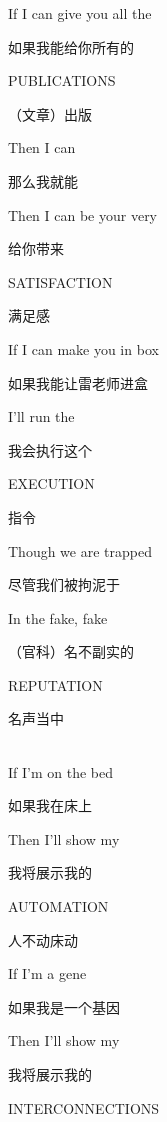 \documentclass[UTF8,12pt,oneside]{ctexbook}
\begin{document}
\begin{center}
            If I can give you all the
            
            如果我能给你所有的
            
            PUBLICATIONS
            
            （文章）出版
            
            Then I can
            
            那么我就能
            
            Then I can be your very
            
            给你带来
            
            SATISFACTION
            
            满足感
            
            If I can make you in box
            
            如果我能让雷老师进盒
            
            I’ll run the
            
            我会执行这个
            
            EXECUTION
            
            指令
            
            Though we are trapped
            
            尽管我们被拘泥于
            
            In the fake, fake
            
            （官科）名不副实的
            
            REPUTATION
            
            名声当中

            ~\\
            If I’m on the bed
            
            如果我在床上
            
            Then I’ll show my
            
            我将展示我的
            
            AUTOMATION
            
            人不动床动
            
            If I’m a gene
            
            如果我是一个基因
            
            Then I’ll show my
            
            我将展示我的
            
            INTERCONNECTIONS
            

\end{center}
\end{document}
